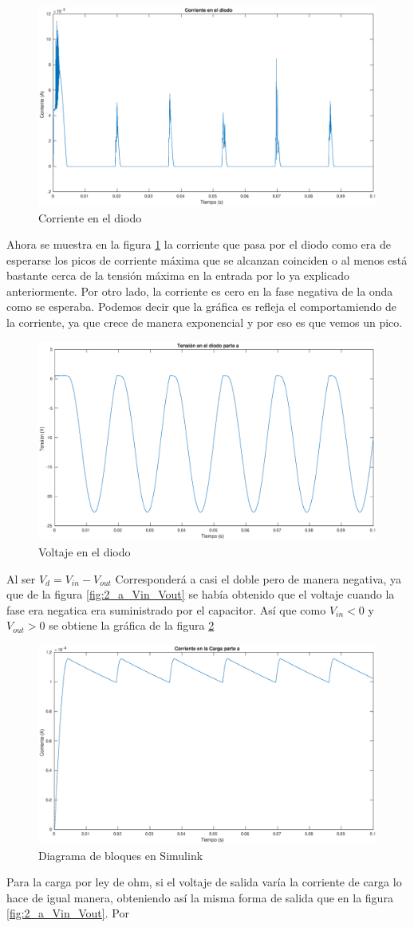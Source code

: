 \documentclass[12pt,letterpaper]{article}
\begin{document}
\begin{figure}[ht!]
  \centering
  \includegraphics[width=0.5\linewidth]{pictures/Ejercicio2_a_corriente_diodo.eps}
  \caption{Corriente en el diodo}
  \label{fig:2_a_Id}
\end{figure}

Ahora se muestra en la figura \ref{fig:2_a_Id} la corriente que pasa por el diodo como era de esperarse los picos de corriente máxima que se alcanzan coinciden o al menos está bastante cerca de la tensión máxima en la entrada por lo ya explicado anteriormente. Por otro lado, la corriente es cero en la fase negativa de la onda como se esperaba. Podemos decir que la gráfica es refleja el comportamiendo de la corriente, ya que crece de manera exponencial y por eso es que vemos un pico.

\begin{figure}[ht!]
  \centering
  \includegraphics[width=0.5\linewidth]{pictures/Ejercicio2_a_Vd.eps}
  \caption{Voltaje en el diodo}
  \label{fig:2_a_Vd}
\end{figure}

Al ser $V_d = V_{in}-V_{out}$ Corresponderá a casi el doble pero de manera negativa, ya que de la figura \ref{fig:2_a_Vin_Vout} se había obtenido que el voltaje cuando la fase era negatica era suministrado por el capacitor. Así que como $V_{in} < 0$ y $V_{out} > 0$ se obtiene la gráfica de la figura \ref{fig:2_a_Vd}

\begin{figure}[ht!]
  \centering
  \includegraphics[width=0.5\linewidth]{pictures/Ejercicio2_a_carga.eps}
  \caption{Diagrama de bloques en Simulink}
  \label{fig:2_a_carga}
\end{figure}
Para la carga por ley de ohm, si el voltaje de salida varía la corriente de carga lo hace de igual manera, obteniendo así la misma forma de salida que en la figura \ref{fig:2_a_Vin_Vout}. Por 
\end{document}
